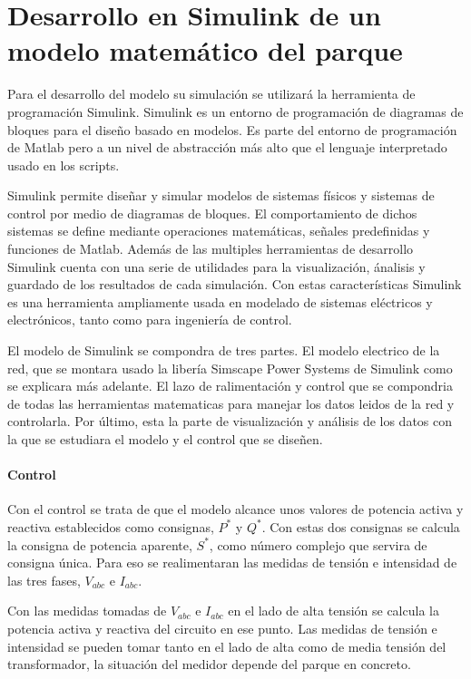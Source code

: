 \documentclass{book}
\begin{document}
	\section{Desarrollo en Simulink de un modelo matem\'atico del parque}

Para el desarrollo del modelo su simulaci\'on se utilizar\'a la herramienta de programaci\'on Simulink. Simulink es un entorno de programaci\'on de diagramas de bloques para el diseño basado en modelos. Es parte del entorno de programaci\'on de Matlab pero a un nivel de abstracci\'on m\'as alto que el lenguaje interpretado usado en los scripts. \par

Simulink permite diseñar y simular modelos de sistemas f\'isicos y sistemas de control por medio de diagramas de bloques. El comportamiento de dichos sistemas se define mediante operaciones matem\'aticas, señales predefinidas y funciones de Matlab. Adem\'as de las multiples herramientas de desarrollo Simulink cuenta con una serie de utilidades para la visualizaci\'on, \'analisis y guardado de los resultados de cada simulaci\'on. Con estas caracter\'isticas Simulink es una herramienta ampliamente usada en modelado de sistemas el\'ectricos y electr\'onicos, tanto como para ingenier\'ia de control. \par

El modelo de Simulink se compondra de tres partes. El modelo electrico de la red, que se montara usado la liber\'ia Simscape Power Systems de Simulink como se explicara m\'as adelante. El lazo de ralimentaci\'on y control que se compondria de todas las herramientas matematicas para manejar los datos leidos de la red y controlarla. Por \'ultimo, esta la parte de visualizaci\'on y an\'alisis de los datos con la que se estudiara el modelo y el control que se diseñen.   \par

		\paragraph{Control} 
Con el control se trata de que el modelo alcance unos valores de potencia activa y reactiva establecidos como consignas, $P^*$ y $Q^*$. Con estas dos consignas se calcula la consigna de potencia aparente, $S^*$, como n\'umero complejo que servira de consigna \'unica. Para eso se realimentaran las medidas de tensi\'on e intensidad de las tres fases, $V_{abc}$ e $I_{abc}$. \par

Con las medidas tomadas de $V_{abc}$ e $I_{abc}$ en el lado de alta tensi\'on se calcula la potencia activa y reactiva del circuito en ese punto. Las medidas de tensi\'on e intensidad se pueden tomar tanto en el lado de alta como de media tensi\'on del transformador, la situaci\'on del medidor depende del parque en concreto. \par
\end{document}
